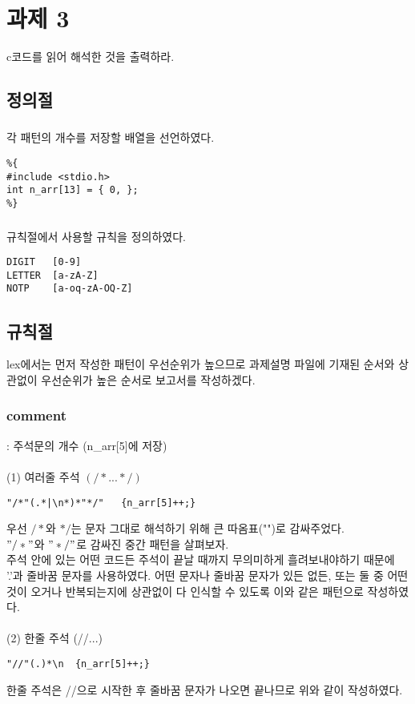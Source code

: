 \documentclass{article}
\begin{document}
	
	\section{과제 3}
	c코드를 읽어 해석한 것을 출력하라.
	\subsection{정의절}
	\subsubsection{} 각 패턴의 개수를 저장할 배열을 선언하였다.
	\begin{lstlisting}
%{
#include <stdio.h>
int n_arr[13] = { 0, };
%}
	\end{lstlisting}
	\subsubsection{} 규칙절에서 사용할 규칙을 정의하였다.
	\begin{lstlisting}
DIGIT	[0-9]
LETTER	[a-zA-Z]
NOTP	[a-oq-zA-OQ-Z]
	\end{lstlisting}

	\subsection{규칙절}
	lex에서는 먼저 작성한 패턴이 우선순위가 높으므로 과제설명 파일에 기재된 순서와 상관없이 우선순위가 높은 순서로 보고서를 작성하겠다.
	\\
	\subsubsection{comment} : 주석문의 개수 (n\_arr[5]에 저장)
	\\
	\\
	(1) 여러줄 주석 $(/*...*/)$
	\begin{lstlisting}
"/*"(.*|\n*)*"*/"	{n_arr[5]++;}
	\end{lstlisting}
	우선 $/*$와 $*/$는 문자 그대로 해석하기 위해 큰 따옴표("")로 감싸주었다.
	\\
	$"/*"$와 $"*/"$로 감싸진 중간 패턴을 살펴보자.\\
	주석 안에 있는 어떤 코드든 주석이 끝날 때까지 무의미하게 흘려보내야하기 때문에 '.'과 줄바꿈 문자를 사용하였다. 어떤 문자나 줄바꿈 문자가 있든 없든, 또는 둘 중 어떤 것이 오거나 반복되는지에 상관없이 다 인식할 수 있도록 이와 같은 패턴으로 작성하였다. 
	\\
	\\
	(2) 한줄 주석 (//...)
	\begin{lstlisting}
"//"(.)*\n	{n_arr[5]++;}
	\end{lstlisting}
	한줄 주석은 //으로 시작한 후 줄바꿈 문자가 나오면 끝나므로 위와 같이 작성하였다.
	\\
\end{document}
